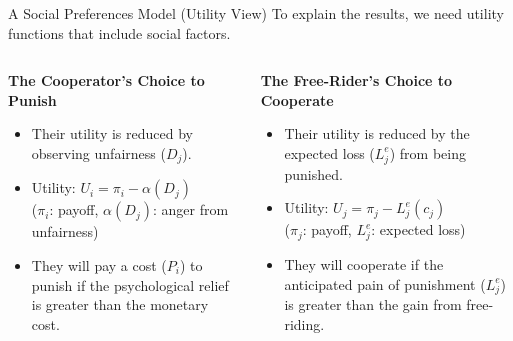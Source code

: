\documentclass{beamer}
\begin{document}
\begin{frame}{A Social Preferences Model (Utility View)}
    To explain the results, we need utility functions that include social factors.
    \begin{columns}[c]
        \begin{column}{.5\textwidth}
            \textbf{The Cooperator's Choice to Punish}
            \begin{itemize}
                \item<1-> Their utility is reduced by observing unfairness ($D_j$).
                \item<2-> Utility: $U_i = \pi_i - \alpha(D_j)$ \\ \footnotesize{($\pi_i$: payoff, $\alpha(D_j)$: anger from unfairness)}
                \pause
                \item<3-> They will pay a cost ($P_i$) to punish if the psychological relief is greater than the monetary cost.
            \end{itemize}
        \end{column}
        \begin{column}{.5\textwidth}
            \textbf{The Free-Rider's Choice to Cooperate}
            \begin{itemize}
                \item<1-> Their utility is reduced by the expected loss ($L_j^e$) from being punished.
                \item<2-> Utility: $U_j = \pi_j - L_j^e(c_j)$ \\ \footnotesize{($\pi_j$: payoff, $L_j^e$: expected loss)}
                \pause
                \item<3-> They will cooperate if the anticipated pain of punishment ($L_j^e$) is greater than the gain from free-riding.
            \end{itemize}
        \end{column}
    \end{columns}
\end{frame}
\end{document}
